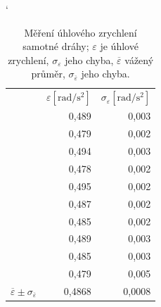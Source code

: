 \documentclass[english]{article}
\newcommand{\unit}[1]{\mathrm{#1}}
\begin{document}
\begin{table}[h!]
\catcode` %
\parbox{.45\linewidth}{
\centering
    \begin{tabular}{|r|r|r|}
\cline{2-3}    \multicolumn{1}{r|}{} & $\varepsilon \unit{[ rad/s^2]}$ & $\sigma_{\varepsilon}\unit{ [rad/s^2]}$ \bigstrut\\
\cline{2-3}    \multicolumn{1}{r|}{} & 0,489 & 0,003 \bigstrut\\
\cline{2-3}    \multicolumn{1}{r|}{} & 0,479 & 0,002 \bigstrut\\
\cline{2-3}    \multicolumn{1}{r|}{} & 0,494 & 0,003 \bigstrut\\
\cline{2-3}    \multicolumn{1}{r|}{} & 0,478 & 0,002 \bigstrut\\
\cline{2-3}    \multicolumn{1}{r|}{} & 0,495 & 0,002 \bigstrut\\
\cline{2-3}    \multicolumn{1}{r|}{} & 0,487 & 0,002 \bigstrut\\
\cline{2-3}    \multicolumn{1}{r|}{} & 0,485 & 0,002 \bigstrut\\
\cline{2-3}    \multicolumn{1}{r|}{} & 0,489 & 0,003 \bigstrut\\
\cline{2-3}    \multicolumn{1}{r|}{} & 0,485 & 0,003 \bigstrut\\
\cline{2-3}    \multicolumn{1}{r|}{} & 0,479 & 0,005 \bigstrut\\
    \hline
    $\overline{\varepsilon} \pm \sigma_{\overline{\varepsilon}}$ & 0,4868 & 0,0008 \bigstrut\\
    \hline
    \end{tabular}%

      
   
  
  \caption{Měření úhlového zrychlení samotné dráhy; $\varepsilon$ je úhlové zrychlení, $\sigma_{\varepsilon}$ jeho chyba, $\overline{\varepsilon}$ vážený průměr, $\sigma_{\overline{\varepsilon}}$ jeho chyba.}
  \label{tab:steiner_draha}

}
\end{table}
\end{document}
